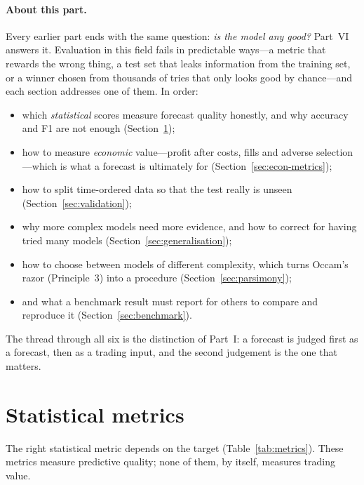 \paragraph{About this part.} Every earlier part ends with the same question: \emph{is the model any
good?} Part~VI answers it. Evaluation in this field fails in predictable ways---a metric that rewards
the wrong thing, a test set that leaks information from the training set, or a winner chosen from
thousands of tries that only looks good by chance---and each section addresses one of them. In order:
\begin{itemize}[leftmargin=1.5em,itemsep=1pt]
\item which \emph{statistical} scores measure forecast quality honestly, and why accuracy and F1 are
  not enough (Section~\ref{sec:stat-metrics});
\item how to measure \emph{economic} value---profit after costs, fills and adverse selection---which is
  what a forecast is ultimately for (Section~\ref{sec:econ-metrics});
\item how to split time-ordered data so that the test really is unseen (Section~\ref{sec:validation});
\item why more complex models need more evidence, and how to correct for having tried many models
  (Section~\ref{sec:generalisation});
\item how to choose between models of different complexity, which turns Occam's razor (Principle~3)
  into a procedure (Section~\ref{sec:parsimony});
\item and what a benchmark result must report for others to compare and reproduce it
  (Section~\ref{sec:benchmark}).
\end{itemize}
The thread through all six is the distinction of Part~I: a forecast is judged first as a forecast, then
as a trading input, and the second judgement is the one that matters.

\section{Statistical metrics}
\label{sec:stat-metrics}

The right statistical metric depends on the target (Table~\ref{tab:metrics}). These metrics
measure predictive quality; none of them, by itself, measures trading value.

